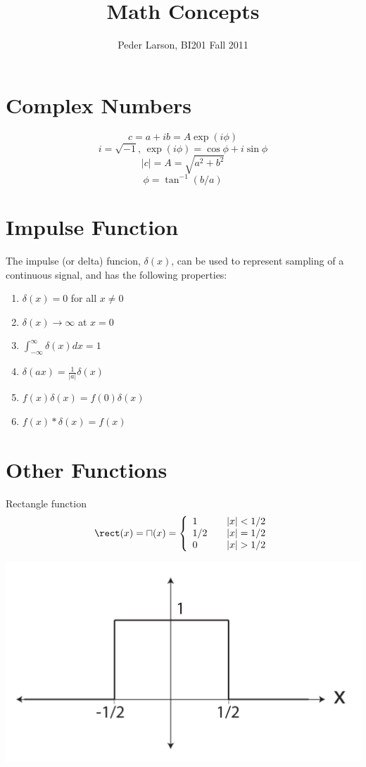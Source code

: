 \documentclass[11pt]{article}
\title{Math Concepts}
\author{Peder Larson, BI201 Fall 2011}
\begin{document}
\maketitle 

\section*{Complex Numbers}

$$c = a + i b = A\exp(i \phi)$$
$$ i = \sqrt{-1}, \,
\exp(i \phi) = \cos \phi + i \sin\phi$$
$$ |c| = A = \sqrt{a^2+b^2}$$
$$ \phi = \tan^{-1} (b/a)$$

\section*{Impulse Function}

The impulse (or delta) funcion, $\delta(x)$, can be used to represent sampling of a continuous signal, and has the following properties:
\begin{enumerate}
\item $\delta(x) = 0$ for all $x \ne 0$
\item $\delta(x) \rightarrow \infty$ at $x =0$
\item $\int_{-\infty}^\infty \delta(x) dx = 1$
\item $\delta(ax) = \frac{1}{|a|} \delta(x)$
\item $f(x) \delta(x) = f(0) \delta(x)$
\item $f(x) \ast \delta(x) = f(x)$
\end{enumerate}

\section*{Other Functions}
Rectangle function
$$\rect(x) = \sqcap(x) = 
\left\{ 
  \begin{array}{l l}
    1 & \quad |x| < 1/2 \\
    1/2 & \quad |x| = 1/2 \\
    0 & \quad |x| > 1/2 \\
  \end{array} \right. $$
\begin{center}
\includegraphics[width=.4\columnwidth]{rect.pdf}
\end{center}
\end{document}
